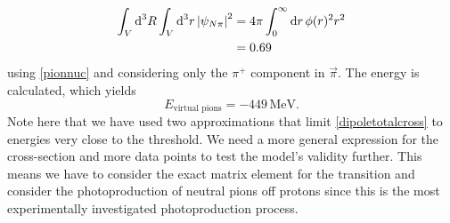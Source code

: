 \begin{align}
	\int_V \text{d}^3R \int_V \text{d}^3 r \, \abs{\psi_{N\pi}}^2 &= 4\pi \int_0^\infty \text{d}r \, \phi(r)^2r^2 \\
	&= 0.69
\end{align}
using \eqref{pionnuc} and considering only the $\pi^+$ component in $\vec{\pi}$. The energy is calculated, which yields
\begin{equation}
	E_{\text{virtual pions}} = -449 \, \text{MeV}.
\end{equation}
Note here that we have used two approximations that limit \eqref{dipoletotalcross} to energies very close to the threshold. We need a more general expression for the cross-section and more data points to test the model's validity further. This means we have to consider the exact matrix element for the transition and consider the photoproduction of neutral pions off protons since this is the most experimentally investigated photoproduction process. 

